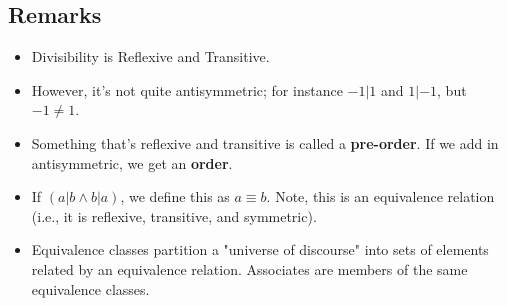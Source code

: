\documentclass[10pt]{article}
\theoremstyle{definition}
\begin{document}
\subsection{Remarks}
\begin{itemize}
\item Divisibility is Reflexive and Transitive.  
\item However, it's not quite antisymmetric; for instance $-1|1$ and $1|-1$, but $-1\neq 1$.  
\item Something that's reflexive and transitive is called a \textbf{pre-order}. If we add in antisymmetric, we get an \textbf{order}.  
\item If $(a|b\land b|a)$, we define this as $a\equiv b$.  Note, this is an equivalence relation (i.e., it is reflexive, transitive, and symmetric).  
\item Equivalence classes partition a "universe of discourse" into sets of elements related by an equivalence relation.  Associates are members of the same equivalence classes.
\end{itemize}
\end{document}
